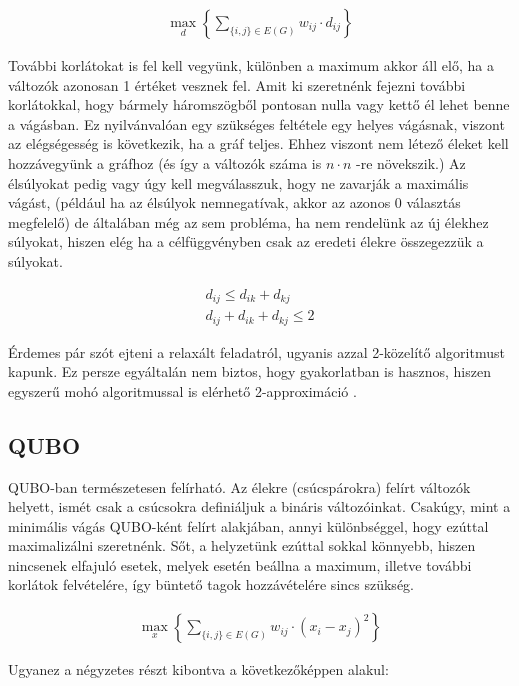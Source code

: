 \begin{align}
	\max_{d} \left\{ \sum_{\{i,j\}\in E(G)}{w_{ij}\cdot d_{ij}}\right\}
\end{align}

További korlátokat is fel kell vegyünk, különben a maximum akkor áll elő, ha a változók azonosan 1 értéket vesznek fel.
Amit ki szeretnénk fejezni további korlátokkal, hogy bármely háromszögből pontosan nulla vagy kettő él lehet benne a vágásban. Ez nyilvánvalóan egy szükséges feltétele egy helyes vágásnak, viszont az elégségesség is következik, ha a gráf teljes. Ehhez viszont nem létező éleket kell hozzávegyünk a gráfhoz (és így a változók száma is $n \cdot n$ -re növekszik.) Az élsúlyokat pedig vagy úgy kell megválasszuk, hogy ne zavarják a maximális vágást, (például ha az élsúlyok nemnegatívak, akkor az azonos 0 választás megfelelő) de általában még az sem probléma, ha nem rendelünk az új élekhez súlyokat, hiszen elég ha a célfüggvényben csak az eredeti élekre összegezzük a súlyokat.

\begin{align}
 d_{ij} \leq d_{ik}+d_{kj}  \\
 d_{ij}+d_{ik}+d_{kj} \leq 2  
\end{align}

Érdemes pár szót ejteni a relaxált feladatról, ugyanis azzal 2-közelítő algoritmust kapunk. Ez persze egyáltalán nem biztos, hogy gyakorlatban is hasznos, hiszen egyszerű mohó algoritmussal is elérhető 2-approximáció \cite{10.5555/1283383.1283390, POLJAK1994191}.


\subsection{QUBO}

QUBO-ban természetesen felírható. Az élekre (csúcspárokra) felírt változók helyett, ismét csak a csúcsokra definiáljuk a bináris változóinkat. Csakúgy, mint a minimális vágás QUBO-ként felírt alakjában, annyi különbséggel, hogy ezúttal maximalizálni szeretnénk. Sőt, a helyzetünk ezúttal sokkal könnyebb, hiszen nincsenek elfajuló esetek, melyek esetén beállna a maximum, illetve további korlátok felvételére, így büntető tagok hozzávételére sincs szükség.

\begin{align}
	\max_{x} \left\{ \sum_{\{i,j\} \in E(G)}{w_{ij} \cdot (x_i-x_j)^2}\right\}
\end{align}

Ugyanez a négyzetes részt kibontva a következőképpen alakul:

